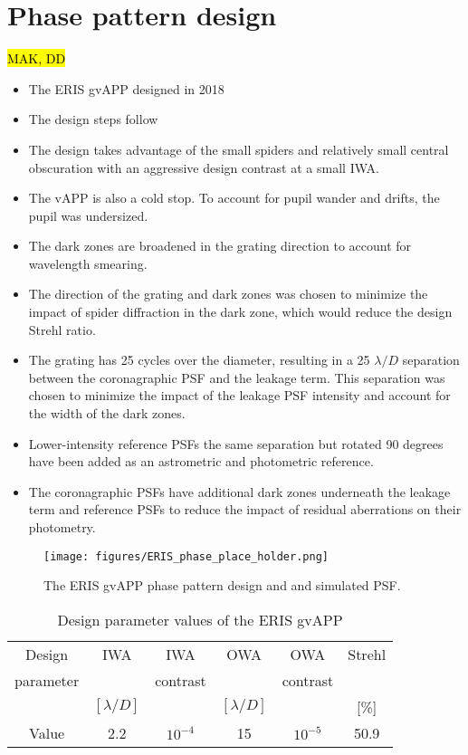 \documentclass{aa}
\begin{document}
\section{Phase pattern design}

\hl{MAK, DD}

\begin{itemize}
    \item The ERIS gvAPP designed in 2018
    
    \item The design steps follow \cite{2021ApOpt..60D..52D}
    \item The design takes advantage of the small spiders and relatively small central obscuration with an aggressive design contrast at a small IWA.
    \item The vAPP is also a cold stop.  To account for pupil wander and drifts, the pupil was undersized.  
    \item The dark zones are broadened in the grating direction to account for wavelength smearing.
    \item The direction of the grating and dark zones was chosen to  minimize the impact of spider diffraction in the dark zone, which would reduce the design Strehl ratio.
    \item The grating has 25 cycles over the diameter, resulting in a 25 $\lambda/D$ separation between the coronagraphic PSF and the leakage term. This separation was chosen to minimize the impact of the leakage PSF intensity and account for the width of the dark zones.
    \item Lower-intensity reference PSFs the same separation but rotated  90 degrees have been added as an astrometric and photometric reference.
    \item  The coronagraphic PSFs have additional dark zones underneath the leakage term and reference PSFs to reduce the impact of residual aberrations on their photometry.

\end{itemize}


\begin{figure}
    \centering
    \texttt{[image: figures/ERIS\_phase\_place\_holder.png]}
    \caption{The ERIS gvAPP phase pattern design and and simulated PSF.}
    \label{fig:gvAPP_phase}
\end{figure}

\begin{table}[h!]
\label{tab:design_param}
\caption{Design parameter values of the ERIS gvAPP}
\begin{tabular}{c|c|c|c|c|c}
     Design & IWA & IWA & OWA & OWA  & Strehl\\
     parameter&& contrast&& contrast&\\
     \hline     
     &$[\lambda/D]$& &$[\lambda/D]$ & & [\%]\\
    \hline
     Value & 2.2 &  $10^{-4}$ &15 &  $10^{-5}$ & 50.9\\
\end{tabular}
\end{table}
\end{document}
